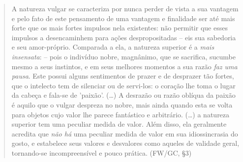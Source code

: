 \documentclass[
	12pt,				%
	openright,			%
	oneside,			%
	a4paper,			%
	english,			%
	french,				%
	spanish,			%
	brazil				%
	]{abntex2}
\begin{document}
\begin{quotation}
A natureza vulgar se caracteriza por nunca perder de vista a sua vantagem e pelo fato de este pensamento de uma vantagem e finalidade ser até mais forte que os mais fortes impulsos nela existentes: não permitir que esses impulsos a desencaminhem para ações despropositadas – eis sua sabedoria e seu amor-próprio. Comparada a ela, a natureza superior é a \textit{mais insensata}: – pois o indivíduo nobre, magnânimo, que se sacrifica, sucumbe mesmo a seus instintos, e em seus melhores momentos a sua razão \textit{faz uma pausa}. Este possui alguns sentimentos de prazer e de desprazer tão fortes, que o intelecto tem de silenciar ou de servi-los: o coração lhe toma o lugar da cabeça e fala-se de 'paixão'. (…) A desrazão ou razão oblíqua da paixão é aquilo que o vulgar despreza no nobre, mais ainda quando esta se volta para objetos cujo valor lhe parece fantástico e arbitrário. (…) a natureza superior tem uma peculiar medida de valor. Além disso, ela geralmente acredita que \textit{não há} uma peculiar medida de valor em sua idiossincrasia do gosto, e estabelece seus valores e desvalores como aqueles de validade geral, tornando-se incompreensível e pouco prática. (FW/GC, §3)

\end{quotation}
\end{document}
